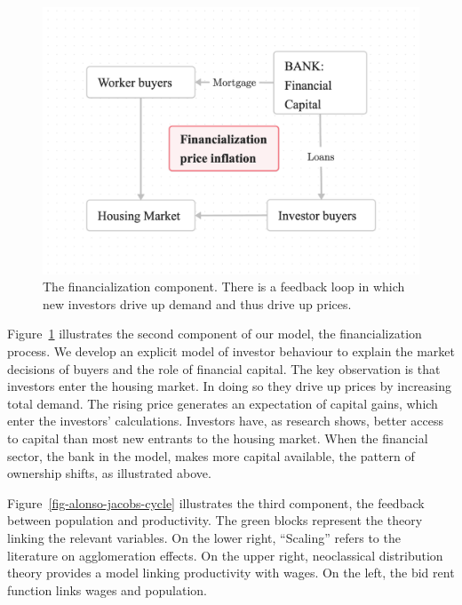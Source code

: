 \begin{figure}[!ht]
\centering
\includegraphics[scale=.20]{fig/flow-financialization.png}
\caption[The financialization component of the model.]{The financialization component. There is a feedback loop in which new investors drive up demand and thus drive up prices.}
\label{fig-financial-cycle}
\end{figure}

Figure~\ref{fig-financial-cycle} illustrates the second component of our model, the financialization process. We develop an explicit model of investor behaviour to explain the market decisions of buyers and the role of financial capital. The key observation is that investors enter the housing market. In doing so they drive up prices by increasing total demand. The rising price generates an expectation of capital gains, which enter the investors' calculations. Investors have, as research shows, better access to capital than most new entrants to the housing market. When the financial sector, the bank in the model, makes more capital available, the pattern of ownership shifts, as illustrated above.

Figure~\ref{fig-alonso-jacobs-cycle} illustrates the third component, the feedback between population and productivity. The green blocks represent the theory linking the relevant variables.  On the lower right, ``Scaling'' refers to the literature on agglomeration effects. On the upper right, neoclassical distribution theory provides a model linking productivity with wages.  On the left, the bid rent function links wages and population.


